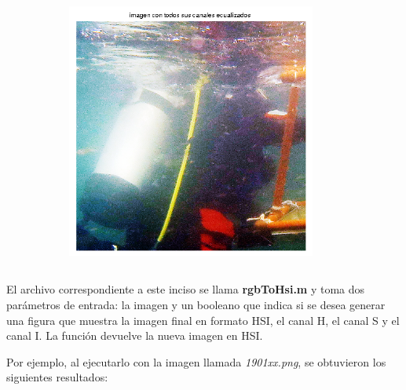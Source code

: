 \documentclass{article}
\begin{document}
\begin{figure}[H]
\begin{subfigure}{0.5\textwidth}
    \end{subfigure}\hfill
	\centering
	\begin{subfigure}{0.5\textwidth}
	\centering
        \includegraphics[width=0.9\textwidth]{1908xx-con-canales-ecualizados.png}
    \end{subfigure}\hfill
\end{figure}

\subsection{}

El archivo correspondiente a este inciso se llama \textbf{rgbToHsi.m} y toma dos parámetros de entrada: la imagen y un booleano que indica si se desea generar una figura que muestra la imagen final en formato HSI, el canal H, el canal S y el canal I. La función devuelve la nueva imagen en HSI.

Por ejemplo, al ejecutarlo con la imagen llamada \textit{1901xx.png}, se obtuvieron los siguientes resultados:
\end{document}
